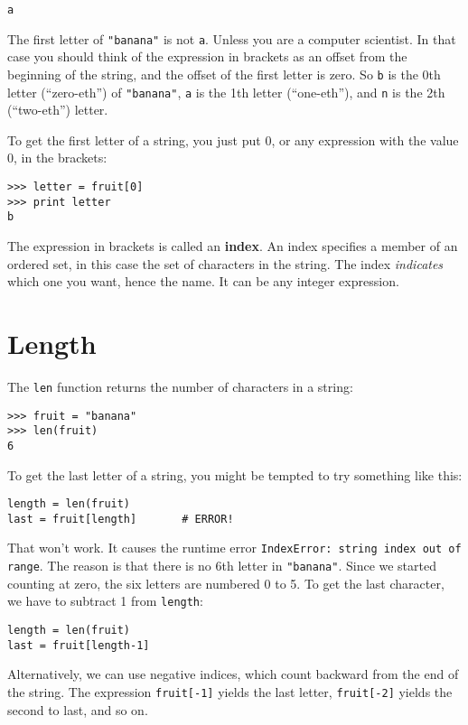 \beforeverb
\begin{verbatim}
a
\end{verbatim}
\afterverb
%
The first letter of {\tt "banana"} is not {\tt a}.  Unless you are a
computer scientist.  In that case you should think of the expression in
brackets as an offset from the beginning of the string, and the offset
of the first letter is zero.  So {\tt b} is the 0th letter
(``zero-eth'') of {\tt "banana"}, {\tt a} is the 1th letter
(``one-eth''), and {\tt n} is the 2th (``two-eth'') letter.

To get the first letter of a string, you just put 0, or
any expression with the value 0, in the brackets:

\beforeverb
\begin{verbatim}
>>> letter = fruit[0]
>>> print letter
b
\end{verbatim}
\afterverb
%
The expression in brackets is called an {\bf index}.  An index
specifies a member of an ordered set, in this case the set of
characters in the string.  The index {\em indicates} which one you
want, hence the name.  It can be any integer expression.



\section{Length}

The {\tt len} function returns the number of characters in a string:

\beforeverb
\begin{verbatim}
>>> fruit = "banana"
>>> len(fruit)
6
\end{verbatim}
\afterverb
%
To get the last letter of a string, you might be tempted to try something
like this:

\beforeverb
\begin{verbatim}
length = len(fruit)
last = fruit[length]       # ERROR!
\end{verbatim}
\afterverb
%
That won't work. It causes the runtime error {\tt IndexError: string
index out of range}.  The reason is that there is no 6th letter in
{\tt "banana"}.  Since we started counting at zero, the six letters
are numbered 0 to 5.  To get the last character, we have to subtract
1 from {\tt length}:


\beforeverb
\begin{verbatim}
length = len(fruit)
last = fruit[length-1]
\end{verbatim}
\afterverb
%
Alternatively, we can use negative indices, which count backward from the end
of the string.  The expression {\tt fruit[-1]} yields the last letter,
{\tt fruit[-2]} yields the second to last, and so on.

